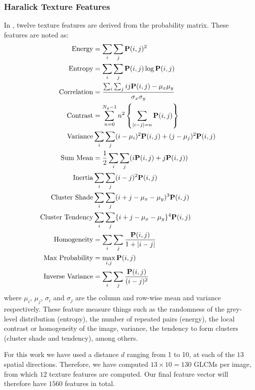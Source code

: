 \subsubsection{Haralick Texture Features}
In \cite{Haralick73,Haralick1992a}, twelve texture features are derived from the probability matrix. These features are noted as:
\begin{align}
\text{Energy} & = \sum\limits_i\sum\limits_j \mathbf{P}(i,j)^2\\ 
\text{Entropy} & = \sum\limits_i\sum\limits_j \mathbf{P}(i,j) \log \mathbf{P}(i,j)\\
\text{Correlation} & = \frac{\sum_i\sum_j ij\mathbf{P}(i,j) - \mu_x\mu_y}{\sigma_x\sigma_y}\\
\text{Contrast} & = \sum\limits_{n=0}^{N_g-1} n^2 \left\lbrace\sum\limits_{|i-j|=n}\mathbf{P}(i,j)\right\rbrace  \\
\text{Variance} & \sum\limits_i\sum\limits_j (i-\mu_i)^2 \mathbf{P}(i,j)+ (j-\mu_j)^2\mathbf{P}(i,j)\\
\text{Sum Mean} & = \frac{1}{2} \sum\limits_i\sum\limits_j(i\mathbf{P}(i,j)+j\mathbf{P}(i,j))\\
\text{Inertia} & \sum\limits_i\sum\limits_j (i-j)^2\mathbf{P}(i,j)\\
\text{Cluster Shade} & \sum\limits_i\sum\limits_j (i+j-\mu_x-\mu_y)^3 \mathbf{P}(i,j)\\
\text{Cluster Tendency} & \sum\limits_i\sum\limits_j \{ i+j-\mu_x-\mu_y\}^4 \mathbf{P}(i,j)\\
\text{Homogeneity} & = \sum\limits_i\sum\limits_j \frac{\mathbf{P}(i,j)}{1+|i-j|}\\
\text{Max Probability} & = \max_{i,j} \mathbf{P}(i,j)\\
\text{Inverse Variance} & = \sum\limits_i\sum\limits_j {\mathbf{P}(i,j) \over (i-j)^2}
\end{align}
where $\mu_i$, $\mu_j$, $\sigma_i$ and $\sigma_j$ are the column and row-wise mean and variance respectively. These feature measure things such as the randomness of the grey-level distribution (entropy), the number of repeated pairs (energy), the local contrast or homogeneity of the image, variance, the tendency to form clusters (cluster shade and tendency), among others. 

For this work we have used a distance $d$ ranging from 1 to 10, at each of the $13$ spatial directions. Therefore, we have computed $13\times10=130$ \acp{GLCM} per image, from which $12$ texture features are computed. Our final feature vector will therefore have $1560$ features in total. 

